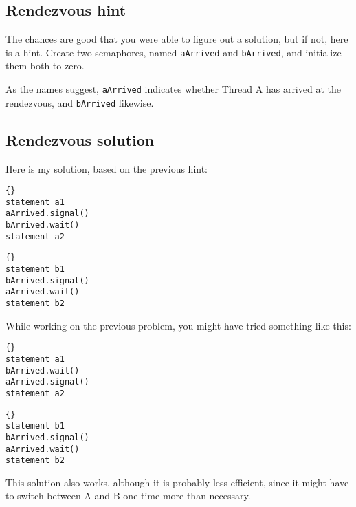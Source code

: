 \documentclass{book}
\newcommand{\clearemptydoublepage}{\newpage\cleardoublepage}
\begin{document}
\clearemptydoublepage
\subsection{Rendezvous hint}

The chances are good that you were able to figure out a solution,
but if not, here is a hint.  Create two semaphores, named {\tt aArrived}
and {\tt bArrived}, and initialize them both to zero.

As the names suggest, {\tt aArrived} indicates whether Thread A
has arrived at the rendezvous, and {\tt bArrived} likewise.

\clearemptydoublepage
\subsection{Rendezvous solution}

Here is my solution, based on the previous hint:

\begin{minipage}[t]{2in}
\begin{lstlisting}[title={Thread A}]{}
statement a1
aArrived.signal()
bArrived.wait()
statement a2
\end{lstlisting}
\end{minipage}
\hfill
\begin{minipage}[t]{2in}
\begin{lstlisting}[title={Thread B}]{}
statement b1
bArrived.signal()
aArrived.wait()
statement b2
\end{lstlisting}
\end{minipage}

While working on the previous problem, you might have
tried something like this:

\begin{minipage}[t]{2in}
\begin{lstlisting}[title={Thread A}]{}
statement a1
bArrived.wait()
aArrived.signal()
statement a2
\end{lstlisting}
\end{minipage}
\hfill
\begin{minipage}[t]{2in}
\begin{lstlisting}[title={Thread B}]{}
statement b1
bArrived.signal()
aArrived.wait()
statement b2
\end{lstlisting}
\end{minipage}

This solution also works, although it is probably less
efficient, since it might have to switch between A and B
one time more than necessary.
\end{document}

